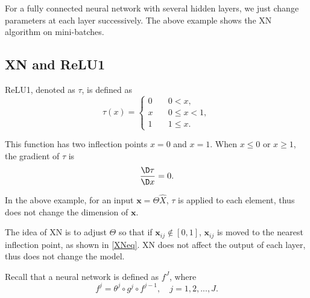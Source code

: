 For a fully connected neural network with several hidden layers, we just change parameters at each layer successively. The above example shows the XN algorithm on mini-batches.
\subsection{XN and ReLU1}
ReLU1, denoted as $\tau$, is defined as 
\begin{equation}
\tau(x) =
	\begin{cases}
		0 \quad & 0 < x, \\
		x \quad &0 \le x < 1, \\
		1 \quad &1 \le  x.
	\end{cases}
\end{equation}

This function has two inflection points $x=0$ and $x=1$. When $x\leq0$ or $x\geq1$, the gradient of $\tau$ is 
\begin{equation}
	\frac{\D\tau}{\D x}=0.
\end{equation}

In the above example, for an input $\mathbf{x}=\Theta\hat X$, $\tau$ is applied to each element, thus does not change the dimension of $\mathbf{x}$.

The idea of XN is to adjust $\Theta$ so that if $\mathbf{x}_{ij}\notin [0,1]$, $\mathbf{x}_{ij}$ is moved to the nearest inflection point, as shown in \eqref{XNeq}. XN does not affect the output of each layer, thus does not change the model.

Recall that a neural network is defined as $f^J$, where
\begin{equation}
f^j = \theta^j \circ g^j \circ f^{j-1},\quad j=1,2,...,J.
\end{equation}

